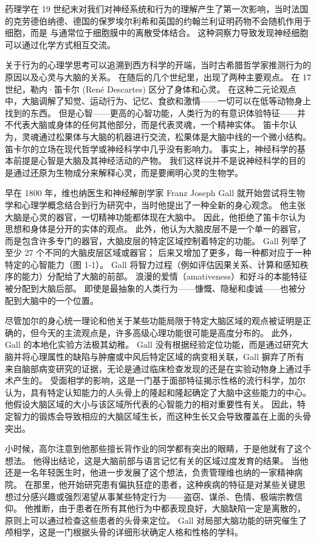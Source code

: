药理学在 19 世纪末对我们对神经系统和行为的理解产生了第一次影响，当时法国的克劳德伯纳德、德国的保罗埃尔利希和英国的约翰兰利证明药物不会随机作用于细胞，而是 与通常位于细胞膜中的离散受体结合。 这种洞察力导致发现神经细胞可以通过化学方式相互交流。

关于行为的心理学思考可以追溯到西方科学的开端，当时古希腊哲学家推测行为的原因以及心灵与大脑的关系。 在随后的几个世纪里，出现了两种主要观点。 在 17 世纪，勒内·笛卡尔 (René Descartes) 区分了身体和心灵。 在这种二元论观点中，大脑调解了知觉、运动行为、记忆、食欲和激情——一切可以在低等动物身上找到的东西。 但是心智——更高的心智功能，人类行为的有意识体验特征——并不代表大脑或身体的任何其他部分，而是代表灵魂，一个精神实体。 笛卡尔认为，灵魂通过松果体与大脑的机器进行交流，松果体是大脑中线的一个微小结构。 笛卡尔的立场在现代哲学或神经科学中几乎没有影响力。 事实上，神经科学的基本前提是心智是大脑及其神经活动的产物。 我们这样说并不是说神经科学的目的是通过还原为生物成分来解释心灵，而是要阐明心灵的生物学。

早在 1800 年，维也纳医生和神经解剖学家 Franz Joseph Gall 就开始尝试将生物学和心理学概念结合到行为研究中，当时他提出了一种全新的身心观念。 他主张大脑是心灵的器官，一切精神功能都体现在大脑中。 因此，他拒绝了笛卡尔认为思想和身体是分开的实体的观点。 此外，他认为大脑皮层不是一个单一的器官，而是包含许多专门的器官，大脑皮层的特定区域控制着特定的功能。 Gall 列举了至少 27 个不同的大脑皮层区域或器官； 后来又增加了更多，每一种都对应于一种特定的心智能力（图 1-1）。 Gall 将智力过程（例如评估因果关系、计算和感知秩序的能力）分配给了大脑的前部。 浪漫的爱情（amativeness）和好斗的本能特征被分配到大脑后部。 即使是最抽象的人类行为——慷慨、隐秘和虔诚——也被分配到大脑中的一个位置。

尽管加尔的身心统一理论和他关于某些功能局限于特定大脑区域的观点被证明是正确的，但今天的主流观点是，许多高级心理功能很可能是高度分布的。 此外，Gall 的本地化实验方法极其幼稚。 Gall 没有根据经验定位功能，而是通过研究大脑并将心理属性的缺陷与肿瘤或中风后特定区域的病变相关联，Gall 摒弃了所有来自脑部病变研究的证据，无论是通过临床检查发现的还是在实验动物身上通过手术产生的。 受面相学的影响，这是一门基于面部特征揭示性格的流行科学，加尔认为，具有特定认知能力的人头骨上的隆起和隆起确定了大脑中这些能力的中心。 他假设大脑区域的大小与该区域所代表的心智能力的相对重要性有关。 因此，特定智力的锻炼会导致相应的大脑区域生长，而这种生长又会导致覆盖在上面的头骨突出。

小时候，高尔注意到他那些擅长背作业的同学都有突出的眼睛，于是他就有了这个想法。 他得出结论，这是大脑前部与语言记忆有关的区域过度发育的结果。 当他还是一名年轻医生时，他进一步发展了这个想法，负责管理维也纳的一家精神病院。 在那里，他开始研究患有偏执狂症的患者，这种疾病的特征是对某些关键思想过分感兴趣或强烈渴望从事某些特定行为——盗窃、谋杀、色情、极端宗教信仰。 他推断，由于患者在所有其他行为中都表现良好，大脑缺陷一定是离散的，原则上可以通过检查这些患者的头骨来定位。 Gall 对局部大脑功能的研究催生了颅相学，这是一门根据头骨的详细形状确定人格和性格的学科。

